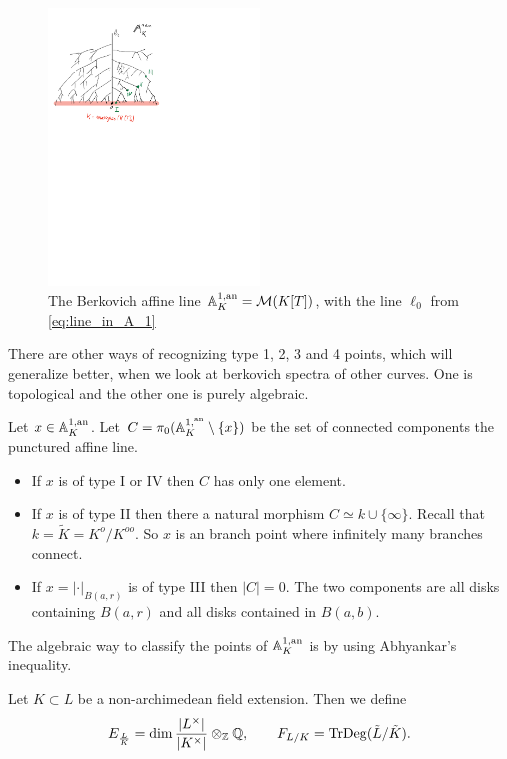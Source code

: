 \begin{figure}[h]
	\centering
	\includegraphics[width=0.5\textwidth]{figures/affine_line}
	\caption{The Berkovich affine line $\mathbb{A}_K^{1, \text{an}} = \mathcal{M} (K[T])$, with the line $\ell_0$ from \cref{eq:line_in_A_1}}
	\label{fig:affine_line}
\end{figure}

There are other ways of recognizing type 1, 2, 3 and 4 points, which will generalize better, when we look at berkovich spectra of other curves. One is topological and the other one is purely algebraic. 

\begin{proposition}
	Let $x \in \mathbb{A}_K^{1,\text{an}}$. 
	Let $C = \pi_0(\mathbb{A}_K^{1, {}^{\text{an}}}\setminus \{ x\} )$ be the set of connected components the punctured affine line. 
	\begin{itemize}
		\item If $x$ is of type I  or IV then $C$ has only one element.
		\item If $x$ is of type II then there a natural morphism $C \simeq k \cup \{\infty\} $. Recall that $k = \tilde K = K^{o} / K^{oo} $. 
			So $x$ is an branch point where infinitely many branches connect. 
		\item If $x = |\cdot |_{B(a, r)}$ is of type III then $|C| = 0$. The two components are all disks containing $B(a, r)$ and all disks contained in $B(a, b)$. 
	\end{itemize}
\end{proposition}
The algebraic way to classify the points of $\mathbb{A}_K^{1,\text{an}}$ is by using Abhyankar's inequality. 
\begin{definition}
	Let $K \subset L$ be a non-archimedean field extension. 
	Then we define \[
		E_{\frac{L}{ K}} = \dim \frac{|L^{\times }|}{|K^{\times }|} \otimes_{\mathbb{Z}} \mathbb{Q}, \qquad F_{L / K} = \operatorname{TrDeg}(\tilde L / \tilde K)
	.\] 
\end{definition}

